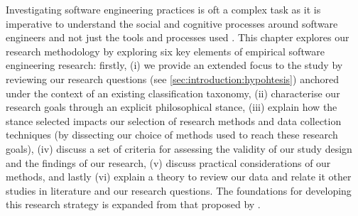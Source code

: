 \label{sec:research-methodology:preface}

Investigating software engineering practices is oft a complex task as it is imperative to understand the social and cognitive processes around software engineers and not just the tools and processes used \citep{Easterbrook:2007ws}. This chapter explores our research methodology by exploring six key elements of empirical software engineering research: firstly, (i) we provide an extended focus to the study by reviewing our research questions (see \cref{sec:introduction:hypohtesis}) anchored under the context of an existing classification taxonomy, (ii) characterise our research goals through an explicit philosophical stance, (iii) explain how the stance selected impacts our selection of research methods and data collection techniques (by dissecting our choice of methods used to reach these research goals), (iv) discuss a set of criteria for assessing the validity of our study design and the findings of our research, (v) discuss practical considerations of our methods, and lastly (vi) explain a theory to review our data and relate it other studies in literature and our research questions. The foundations for developing this research strategy is expanded from that proposed by \citet{Easterbrook:2007ws}.